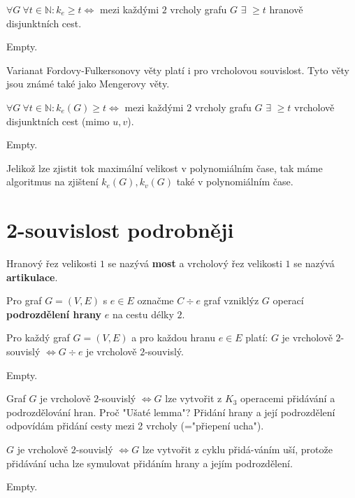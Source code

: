 \begin{veta}
	$\forall G \ \forall t \in \mathbb{N}: k_{e} \geq t \Leftrightarrow$ mezi každými $2$ vrcholy grafu $G$ $\exists$ $\geq t$ hranově disjunktních cest.
\end{veta}

\begin{dukaz}
	Empty.
\end{dukaz}

Varianat Fordovy-Fulkersonovy věty platí i pro vrcholovou souvislost. Tyto věty jsou známé také jako Mengerovy věty.

\begin{veta}
	$\forall G \ \forall t \in \mathbb{N}: k_{e}(G) \geq t \Leftrightarrow$ mezi každými $2$ vrcholy grafu $G$ $\exists$ $\geq t$ vrcholově disjunktních cest (mimo $u,v$).
\end{veta}

\begin{dukaz}
	Empty.
\end{dukaz}

Jelikož lze zjistit tok maximální velikost v polynomiálním čase, tak máme algoritmus na zjištení $k_{e}(G), k_{v}(G)$ také v polynomiálním čase.

\section{2-souvislost podrobněji}

\begin{definice}
	Hranový řez velikosti $1$ se nazývá \textbf{most} a vrcholový řez velikosti  $1$ se nazývá \textbf{artikulace}.
\end{definice}

Pro graf $G=(V,E)$ s $e \in E$ označme $C \div e$ graf vzniklýz $G$ operací \textbf{podrozdělení hrany} $e$ na cestu délky $2$.

\begin{lemma}
	Pro každý graf $G=(V,E)$ a pro každou hranu $e \in E$ platí: $G$ je vrcholově $2$-souvislý $\Leftrightarrow G \div e$ je vrcholově $2$-souvislý.
\end{lemma}

\begin{dukaz}
	Empty.
\end{dukaz}

\begin{veta}
	Graf $G$ je vrcholově $2$-souvislý $\Leftrightarrow G$ lze vytvořit z $K_{3}$ operacemi přidávání a podrozdělování hran. Proč "Ušaté lemma"? Přidání hrany a její podrozdělení odpovídám přidání cesty mezi 2 vrcholy (="přiepení ucha").
\end{veta}

\begin{veta}
	$G$ je vrcholově $2$-souvislý $\Leftrightarrow G$ lze vytvořit z cyklu přidá-\newline váním uší, protože přidávání ucha lze symulovat přidáním hrany a jejím podrozdělení.
\end{veta}

\begin{dukaz}
	Empty.
\end{dukaz}